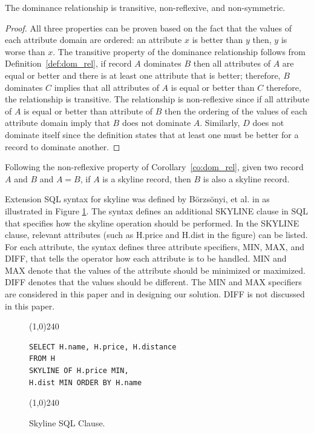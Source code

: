 \begin{corollary}\label{co:dom_rel}
The dominance relationship is transitive, non-reflexive, and
non-symmetric.
\end{corollary}

\begin{proof}
All three properties can be proven based on the fact that the values of
each attribute domain are ordered: an attribute $x$ is better than $y$ then,
$y$ is worse than $x$. The transitive property of the dominance relationship
follows
from Definition~\ref{def:dom_rel}, if record $A$ dominates $B$ then all
attributes of $A$ are equal or better and there is at least one attribute
that is better; therefore, $B$ dominates $C$ implies that all attributes
of $A$ is
equal or better than $C$ therefore, the relationship is transitive.
The relationship is non-reflexive since if all attribute of $A$ is equal
or better than attribute of $B$ then the ordering of the values of each
attribute domain imply that $B$ does not dominate
$A$. Similarly, $D$ does not dominate itself since the definition states
that at least one must be better for a record to dominate another.
\end{proof}

Following the non-reflexive property of Corollary~\ref{co:dom_rel}, given
two record $A$ and $B$ and $A = B$, if $A$ is a skyline record, then
$B$ is also a skyline record.

Extension SQL syntax for skyline was defined by B\"{o}rzs\"{o}nyi,
et al. in \cite{skyline_operator} as illustrated in Figure
\ref{fig:skyline_sql}. The syntax defines an additional SKYLINE
clause in SQL that specifies how the skyline operation should be
performed. In the SKYLINE clause, relevant attributes (such as
H.price and H.dist in the figure) can be listed. For each
attribute, the syntax defines three attribute specifiers, MIN,
MAX, and DIFF, that tells the operator how each attribute is to be
handled. MIN and MAX denote that the values of the attribute
should be minimized or maximized. DIFF denotes that the values
should be different. The MIN and MAX specifiers are considered in
this paper and in designing our solution. DIFF is not discussed in
this paper.

\begin{figure}[h]
\begin{center}
\line(1,0){240}
\begin{verbatim}
SELECT H.name, H.price, H.distance
FROM H
SKYLINE OF H.price MIN,
H.dist MIN ORDER BY H.name
\end{verbatim}
\line(1,0){240} \caption{\small Skyline SQL Clause.
\label{fig:skyline_sql}}
\end{center}
\end{figure}


